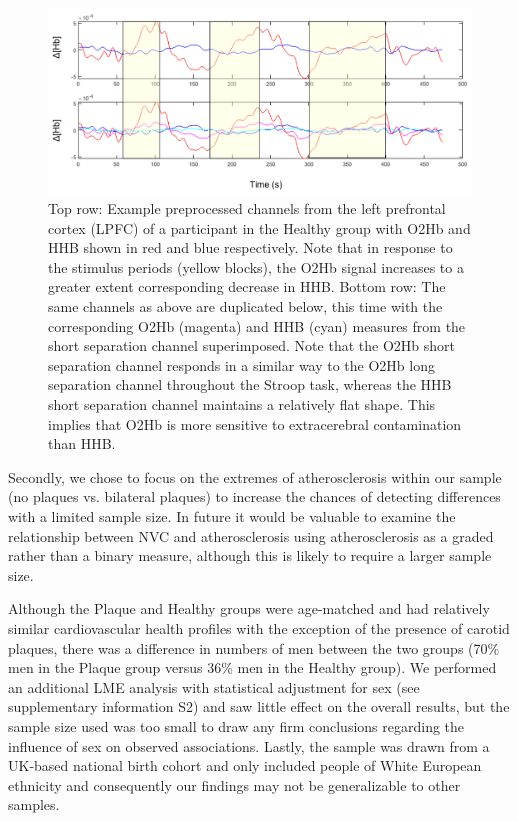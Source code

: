 \documentclass[12pt]{spieman}  %
\begin{document}
\begin{spacing}{2}
\begin{figure}
\begin{center}
\includegraphics[width = \linewidth]{Fig5_channelDiscussion.jpg}
\end{center}
\caption 
{\label{fig:channelDiscussion} Top row: Example preprocessed channels from the left prefrontal cortex (LPFC) of a participant in the Healthy group with O2Hb and HHB shown in red and blue respectively. Note that in response to the stimulus periods (yellow blocks), the O2Hb signal increases to a greater extent corresponding decrease in HHB. Bottom row: The same channels as above are duplicated below, this time with the corresponding O2Hb (magenta) and HHB (cyan) measures from the short separation channel superimposed. Note that the O2Hb short separation channel responds in a similar way to the O2Hb long separation channel throughout the Stroop task, whereas the HHB short separation channel maintains a relatively flat shape. This implies that O2Hb is more sensitive to extracerebral contamination than HHB.} 
\end{figure} 

Secondly, we chose to focus on the extremes of atherosclerosis within our sample (no plaques vs. bilateral plaques) to increase the chances of detecting differences with a limited sample size. In future it would be valuable to examine the relationship between NVC and atherosclerosis using atherosclerosis as a graded rather than a binary measure, although this is likely to require a larger sample size.

Although the Plaque and Healthy groups were age-matched and had relatively similar cardiovascular health profiles with the exception of the presence of carotid plaques, there was a difference in numbers of men between the two groups (70\% men in the Plaque group versus 36\% men in the Healthy group). We performed an additional LME analysis with statistical adjustment for sex (see supplementary information S2) and saw little effect on the overall results, but the sample size used was too small to draw any firm conclusions regarding the influence of sex on observed associations. Lastly, the sample was drawn from a UK-based national birth cohort and only included people of White European ethnicity and consequently our findings may not be generalizable to other samples.


\end{spacing}
\end{document}
